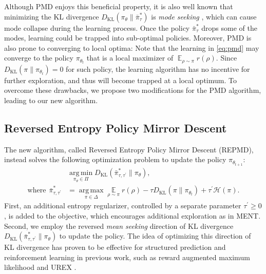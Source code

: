 \documentclass{article}
\DeclareMathOperator*\argmin{arg\,min}
\DeclareMathOperator*\argmax{arg\,max}
\DeclareMathOperator*\ep{\mathbb{E}}
\newcommand*{\cH}{\mathcal{H}}
\newcommand{\KL}{D_{\text{KL}}}
\newcommand{\pithetat}{\pi_{\theta_t}}
\begin{document}
Although PMD enjoys this beneficial property, it is also well known that minimizing the KL divergence $\KL(\pi_\theta \| \bar{\pi}_\tau^*) $ is \emph{mode seeking} \cite{kevin2012machine}, which can cause mode collapse during the learning process. Once the policy $\bar{\pi}_\tau^*$ drops some of the modes, learning could be trapped into sub-optimal policies. Moreover, PMD is also prone to converging to local optima:
Note that the learning in \cref{eq:pmd} may converge to the policy $\pithetat$ that is a local maximizer of $\ep_{\rho \sim \pi} r(\rho)$. 
Since $\KL(\pi \| \pithetat) = 0$ for such policy, the learning algorithm has no incentive for further exploration, and thus will become trapped at a local optimum.
To overcome these drawbacks, we propose two modifications for the PMD algorithm, leading to our new algorithm.

\subsection{Reversed Entropy Policy Mirror Descent}
\label{sec:repmd}
The new algorithm, called Reversed Entropy Policy Mirror Descent (REPMD), instead solves the following optimization problem to update the policy $\pi_{\theta_{t+1}}$:
\begin{equation}
\label{eq:repmd}
\begin{split}
&\argmin\limits_{\pi_\theta \in \Pi}{\KL(\bar{\pi}_{\tau,\tau^{\prime}}^* \| \pi_\theta) }, \\
\text{where}\ \ \bar{\pi}_{\tau,\tau^{\prime}}^* & =  \argmax\limits_{\pi \in \Delta}{ \ep\limits_{\rho \sim \pi}{  r(\rho)  - \tau \KL(\pi \| \pi_{\theta_t}) + \tau^{\prime} \cH(\pi)} }.
\end{split}
\end{equation}
First, an additional entropy regularizer, controlled by a separate parameter $\tau^{\prime}\geq 0$, is added to the objective, which encourages additional exploration as in MENT. 
Second, we employ the reversed \emph{mean seeking} direction of KL divergence $\KL(\bar{\pi}_{\tau,\tau^{\prime}}^* \| \pi_\theta)$ to update the policy. 
The idea of optimizing this direction of KL divergence has proven to be effective for structured prediction and reinforcement learning in previous work, such as reward augmented maximum likelihood \cite{norouzi2016reward} and UREX \cite{nachum2017improving}.
\end{document}
